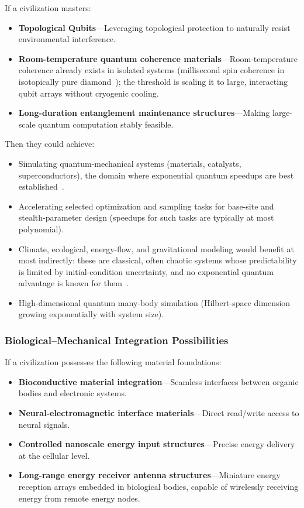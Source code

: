 \documentclass[aps,prd,twocolumn,superscriptaddress,nofootinbib]{revtex4-2}
\begin{document}
If a civilization masters:

\begin{itemize}
  \item \textbf{Topological Qubits}---Leveraging topological protection to naturally resist environmental interference.
  \item \textbf{Room-temperature quantum coherence materials}---Room-temperature coherence already exists in isolated systems (millisecond spin coherence in isotopically pure diamond~\cite{Balasubramanian2009}); the threshold is scaling it to large, interacting qubit arrays without cryogenic cooling.
  \item \textbf{Long-duration entanglement maintenance structures}---Making large-scale quantum computation stably feasible.
\end{itemize}

Then they could achieve:

\begin{itemize}
  \item Simulating quantum-mechanical systems (materials, catalysts, superconductors), the domain where exponential quantum speedups are best established~\cite{Hoefler2023}.
  \item Accelerating selected optimization and sampling tasks for base-site and stealth-parameter design (speedups for such tasks are typically at most polynomial).
  \item Climate, ecological, energy-flow, and gravitational modeling would benefit at most indirectly: these are classical, often chaotic systems whose predictability is limited by initial-condition uncertainty, and no exponential quantum advantage is known for them~\cite{Tennie2023}.
  \item High-dimensional quantum many-body simulation (Hilbert-space dimension growing exponentially with system size).
\end{itemize}

\subsubsection{Biological--Mechanical Integration Possibilities}\label{sec:bio-mech}

If a civilization possesses the following material foundations:

\begin{itemize}
  \item \textbf{Bioconductive material integration}---Seamless interfaces between organic bodies and electronic systems.
  \item \textbf{Neural-electromagnetic interface materials}---Direct read/write access to neural signals.
  \item \textbf{Controlled nanoscale energy input structures}---Precise energy delivery at the cellular level.
  \item \textbf{Long-range energy receiver antenna structures}---Miniature energy reception arrays embedded in biological bodies, capable of wirelessly receiving energy from remote energy nodes.
\end{itemize}
\end{document}
